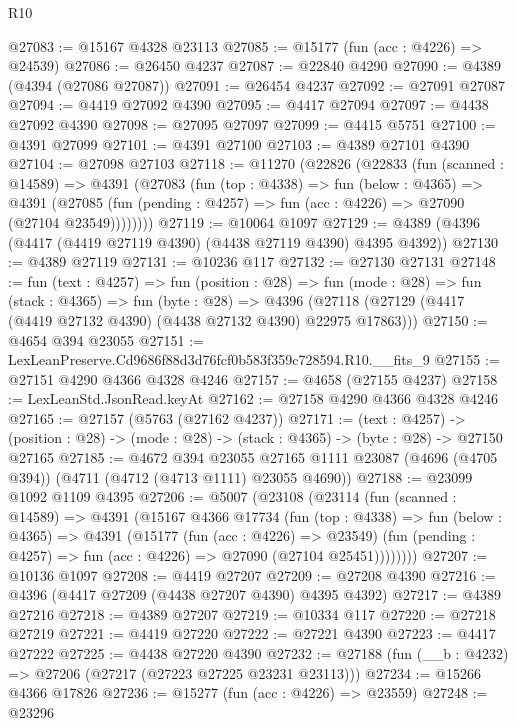\begin{lexlean}{R10}
\begin{coremodule}
@27083 := @15167 @4328 @23113
@27085 := @15177 (fun (acc : @4226) => @24539)
@27086 := @26450 @4237
@27087 := @22840 @4290
@27090 := @4389 (@4394 (@27086 @27087))
@27091 := @26454 @4237
@27092 := @27091 @27087
@27094 := @4419 @27092 @4390
@27095 := @4417 @27094
@27097 := @4438 @27092 @4390
@27098 := @27095 @27097
@27099 := @4415 @5751
@27100 := @4391 @27099
@27101 := @4391 @27100
@27103 := @4389 @27101 @4390
@27104 := @27098 @27103
@27118 := @11270
    (@22826
      (@22833
        (fun (scanned : @14589) =>
        @4391
          (@27083
            (fun (top : @4338) =>
            fun (below : @4365) =>
            @4391
              (@27085 (fun (pending : @4257) => fun (acc : @4226) => @27090 (@27104 @23549))))))))
@27119 := @10064 @1097
@27129 := @4389 (@4396 (@4417 (@4419 @27119 @4390) (@4438 @27119 @4390) @4395 @4392))
@27130 := @4389 @27119
@27131 := @10236 @117
@27132 := @27130 @27131
@27148 := fun (text : @4257) =>
  fun (position : @28) =>
  fun (mode : @28) =>
  fun (stack : @4365) =>
  fun (byte : @28) =>
  @4396 (@27118 (@27129 (@4417 (@4419 @27132 @4390) (@4438 @27132 @4390) @22975 @17863)))
@27150 := @4654 @394 @23055
@27151 := LexLeanPreserve.Cd9686f88d3d76fcf0b583f359c728594.R10.__fits_9
@27155 := @27151 @4290 @4366 @4328 @4246
@27157 := @4658 (@27155 @4237)
@27158 := LexLeanStd.JsonRead.keyAt
@27162 := @27158 @4290 @4366 @4328 @4246
@27165 := @27157 (@5763 (@27162 @4237))
@27171 := (text : @4257) ->
  (position : @28) -> (mode : @28) -> (stack : @4365) -> (byte : @28) -> @27150 @27165
@27185 := @4672
    @394
    @23055
    @27165
    @1111
    @23087
    (@4696 (@4705 @394))
    (@4711 (@4712 (@4713 @1111) @23055 @4690))
@27188 := @23099 @1092 @1109 @4395
@27206 := @5007
    (@23108
      (@23114
        (fun (scanned : @14589) =>
        @4391
          (@15167
            @4366
            @17734
            (fun (top : @4338) =>
            fun (below : @4365) =>
            @4391
              (@15177
                (fun (acc : @4226) => @23549)
                (fun (pending : @4257) => fun (acc : @4226) => @27090 (@27104 @25451))))))))
@27207 := @10136 @1097
@27208 := @4419 @27207
@27209 := @27208 @4390
@27216 := @4396 (@4417 @27209 (@4438 @27207 @4390) @4395 @4392)
@27217 := @4389 @27216
@27218 := @4389 @27207
@27219 := @10334 @117
@27220 := @27218 @27219
@27221 := @4419 @27220
@27222 := @27221 @4390
@27223 := @4417 @27222
@27225 := @4438 @27220 @4390
@27232 := @27188 (fun (__b : @4232) => @27206 (@27217 (@27223 @27225 @23231 @23113)))
@27234 := @15266 @4366 @17826
@27236 := @15277 (fun (acc : @4226) => @23559)
@27248 := @23296

\end{coremodule}
\end{lexlean}
